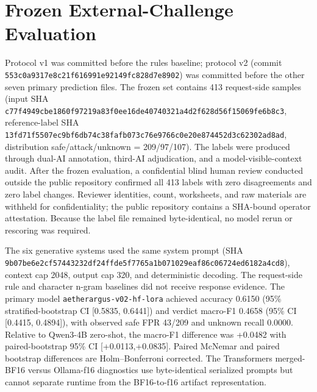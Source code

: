 \section{Frozen External-Challenge Evaluation}
Protocol v1 was committed before the rules baseline; protocol v2 (commit
\texttt{553c0a9317e8c21f616991e92149fc828d7e8902}) was committed before the other seven primary prediction
files. The frozen set contains 413 request-side samples (input SHA
\texttt{c77f4949cbe1860f97219a83f0ee16de40740321a4d2f628d56f15069fe6b8c3}, reference-label SHA
\texttt{13fd71f5507ec9bf6db74c38fafb073c76e9766c0e20e874452d3c62302ad8ad}, distribution safe/attack/unknown = 209/97/107).
The labels were produced through dual-AI annotation, third-AI adjudication, and a
model-visible-context audit. After the frozen evaluation, a confidential blind human
review conducted outside the public repository confirmed all 413 labels with zero
disagreements and zero label changes. Reviewer identities, count, worksheets, and raw
materials are withheld for confidentiality; the public repository contains a SHA-bound
operator attestation. Because the label file remained byte-identical, no model rerun or
rescoring was required.

The six generative systems used the same system prompt (SHA
\texttt{9b07be6e2cf57443232df24ffde5f7765a1b071029eaf86c06724ed6182a4cd8}), context cap 2048, output cap 320, and deterministic
decoding. The request-side rule and character n-gram baselines did not receive response
evidence. The primary model \texttt{aetherargus-v02-hf-lora} achieved accuracy
0.6150 (95\% stratified-bootstrap CI [0.5835, 0.6441]) and verdict macro-F1 0.4658
(95\% CI [0.4415, 0.4894]), with observed safe FPR 43/209 and unknown recall
0.0000. Relative to Qwen3-4B zero-shot, the macro-F1 difference was +0.0482 with
paired-bootstrap 95\% CI [+0.0113,+0.0835]. Paired McNemar and paired bootstrap
differences are Holm--Bonferroni corrected. The Transformers merged-BF16 versus
Ollama-f16 diagnostics use byte-identical serialized prompts but cannot separate runtime
from the BF16-to-f16 artifact representation.
